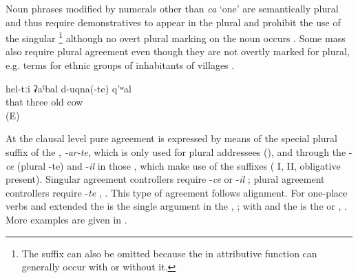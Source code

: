 Noun phrases modified by numerals other than \textit{ca} `one' are semantically plural and thus require demonstratives to appear in the plural and prohibit the use of the singular \footnote{The suffix can also be omitted because the  in attributive function can generally occur with or without it.} although no overt plural marking on the noun occurs . Some mass  also require plural agreement even though they are not overtly marked for plural, e.g. terms for ethnic groups of inhabitants of villages .

\begin{exe}
	\ex	\label{ex:‎‎‎three old cowsAGREE}
	\gll	hel-tːi ʡaˁbal	d-uqna(-te)	q'ʷal\\
		that three old 	cow\\
	\glt	{} (E)
\end{exe}

At the clausal level pure  agreement is expressed by means of the special plural suffix of the , \textit{-ar-te}, which is only used for plural addressees  (), and through the  -\textit{ce} (plural -te) and -\textit{il} in those , which make use of the suffixes ( I,  II, obligative present). Singular agreement controllers require -\textit{ce}  or -\textit{il} ; plural agreement controllers require -\textit{te} , . This type of agreement follows  alignment. For one-place verbs and extended  the   is the single argument in the  , ; with  and  the   is the   or  , . More examples are given in .

